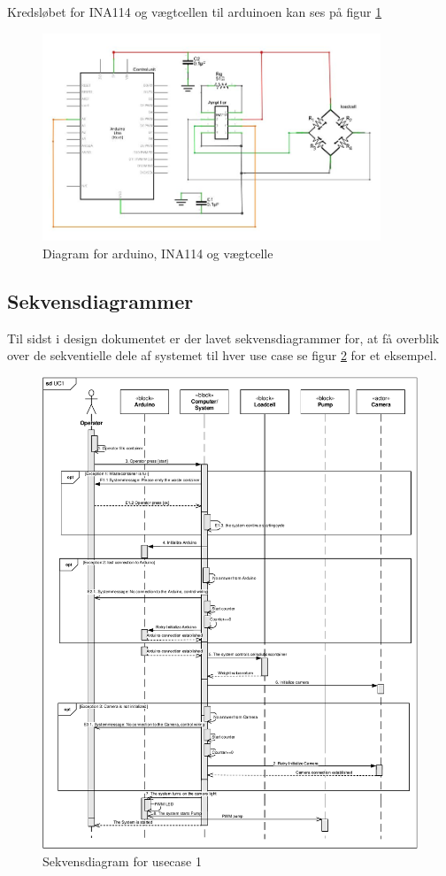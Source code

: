  Kredsløbet for INA114 og vægtcellen til arduinoen kan ses på figur \ref{fig:loadcelldiagram}
 
  \begin{figure}[H]
	\centering
	\includegraphics[width=0.9\textwidth]{billeder/Hardware/diagrammer/loadcelldiagram.JPG}
	\caption{Diagram for arduino, INA114 og vægtcelle}
	\label{fig:loadcelldiagram}
\end{figure}

\subsection{Sekvensdiagrammer}
Til sidst i design dokumentet er der lavet sekvensdiagrammer for, at få overblik over de sekventielle dele af systemet til hver use case se figur \ref{fig:sekvendisgr} for et eksempel.
\begin{figure}[H]
	\centering
	\includegraphics[width=1\textwidth]{pdf/UC1_cropped.pdf}
	\caption{Sekvensdiagram for usecase 1}
	\label{fig:sekvendisgr}
\end{figure}


